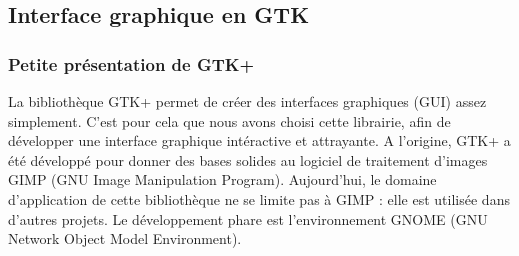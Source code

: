 \documentclass[a4paper,12pt]{article}
\begin{document}
	\subsection{Interface graphique en GTK}

		\subsubsection{Petite présentation de GTK+}
La bibliothèque GTK+ permet de créer des interfaces graphiques (GUI) assez
simplement. C'est pour cela que nous avons choisi cette librairie, afin de
développer une interface graphique intéractive et attrayante. A l'origine, GTK+
a été développé pour donner des bases solides au logiciel de traitement d'images
GIMP (GNU Image Manipulation Program). Aujourd'hui, le domaine d'application de
cette bibliothèque ne se limite pas à GIMP : elle est utilisée dans d'autres
projets. Le développement phare est l'environnement  GNOME (GNU Network Object
Model Environment).
\end{document}
